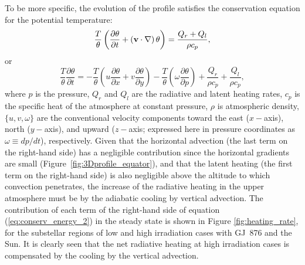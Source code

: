 \documentclass[11pt,numberedappendix,twocolappendix,]{emulateapj}
\def\revise#1{{\color{red}{#1}}}
\begin{document}
To be more specific, the evolution of the profile satisfies the conservation equation for the potential temperature: 
\begin{equation}
\frac{T}{\theta } \left( \frac{\partial \theta }{\partial t} + ( {\bf v} \cdot \nabla ) \, \theta \right) = \frac{ Q_r + Q_l }{\rho c_p} ,   \label{eq:conserv_energy}
\end{equation}
or
\begin{equation}
\frac{T}{\theta } \frac{\partial \theta }{\partial t} = - \frac{T}{\theta }\left( u \frac{\partial \theta }{\partial x} + v\frac{\partial \theta }{\partial y} \right) -\frac{T}{\theta } \left(  \omega \frac{\partial \theta }{\partial p} \right)  + \frac{ Q_r }{\rho c_p} + \frac{ Q_l }{\rho c_p}, \label{eq:conserv_energy_2}
\end{equation}
where $p$ is the pressure, $Q_r$ and $Q_l$ are the radiative and latent heating rates, $c_p$ is the specific heat of the atmosphere at constant pressure, $\rho $ is atmospheric density, $\{ u, v, \omega \}$ are the conventional velocity components toward the east ($x-$axis), north ($y-$axis), and upward ($z-$axis; expressed here in pressure coordinates as $\omega \equiv dp/dt$), respectively. 
%
Given that the horizontal advection (the last term on the right-hand side) has a negligible contribution since the horizontal gradients are small (Figure~\ref{fig:3Dprofile_equator}), and that the latent heating (the first term on the right-hand side) is also negligible above the altitude to which convection penetrates, the increase of the radiative heating in the upper atmosphere must be \revise{balanced} by the adiabatic cooling by vertical advection. %
The contribution of each term of the right-hand side of equation (\ref{eq:conserv_energy_2}) in the steady state is shown in Figure \ref{fig:heating_rate}, for the substellar regions of low and high irradiation cases with GJ~876 and the Sun. %
It is clearly seen that the net radiative heating at high irradiation cases is compensated by the cooling by the vertical advection. 
\end{document}
